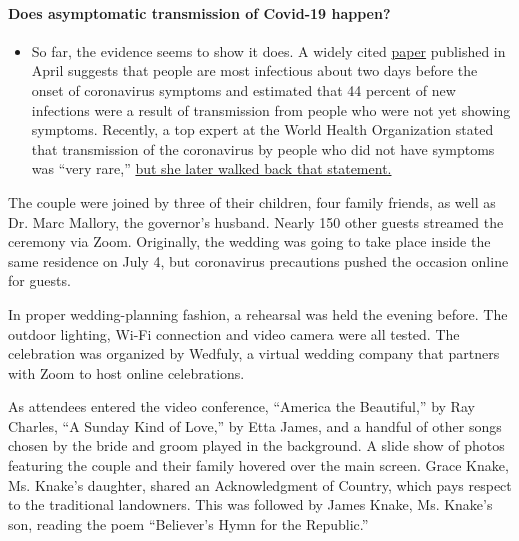 \begin{itemize}
{  \paragraph{Does asymptomatic transmission of Covid-19
  happen?}\label{does-asymptomatic-transmission-of-covid-19-happen}}

  \begin{itemize}
  \tightlist
  \item
    So far, the evidence seems to show it does. A widely cited
    \href{https://www.nature.com/articles/s41591-020-0869-5}{paper}
    published in April suggests that people are most infectious about
    two days before the onset of coronavirus symptoms and estimated that
    44 percent of new infections were a result of transmission from
    people who were not yet showing symptoms. Recently, a top expert at
    the World Health Organization stated that transmission of the
    coronavirus by people who did not have symptoms was ``very rare,''
    \href{https://www.nytimes.com/2020/06/09/world/coronavirus-updates.html?action=click\&pgtype=Article\&state=default\&region=MAIN_CONTENT_3\&context=storylines_faq\#link-1f302e21}{but
    she later walked back that statement.}
  \end{itemize}
\end{itemize}

The couple were joined by three of their children, four family friends,
as well as Dr. Marc Mallory, the governor's husband. Nearly 150 other
guests streamed the ceremony via Zoom. Originally, the wedding was going
to take place inside the same residence on July 4, but coronavirus
precautions pushed the occasion online for guests.

In proper wedding-planning fashion, a rehearsal was held the evening
before. The outdoor lighting, Wi-Fi connection and video camera were all
tested. The celebration was organized by Wedfuly, a virtual wedding
company that partners with Zoom to host online celebrations.

As attendees entered the video conference, ``America the Beautiful,'' by
Ray Charles, ``A Sunday Kind of Love,'' by Etta James, and a handful of
other songs chosen by the bride and groom played in the background. A
slide show of photos featuring the couple and their family hovered over
the main screen. Grace Knake, Ms. Knake's daughter, shared an
Acknowledgment of Country, which pays respect to the traditional
landowners. This was followed by James Knake, Ms. Knake's son, reading
the poem ``Believer's Hymn for the Republic.''

